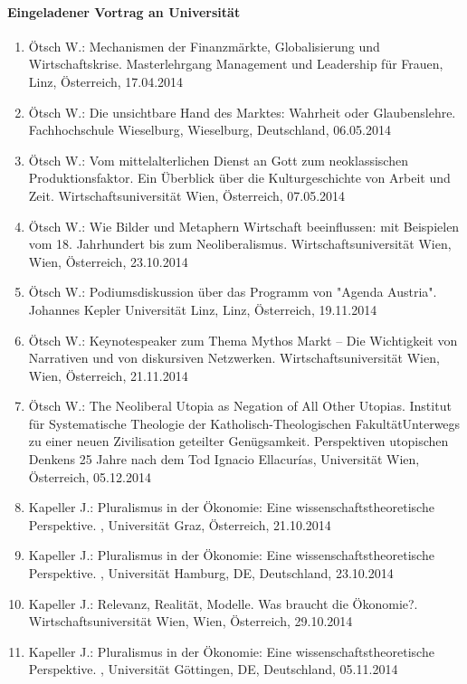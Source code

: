 \paragraph{Eingeladener Vortrag an Universität}
\begin{enumerate}
	\item Ötsch W.: Mechanismen der Finanzmärkte, Globalisierung und Wirtschaftskrise. Masterlehrgang Management und Leadership für Frauen, Linz, Österreich, 17.04.2014
	\item Ötsch W.: Die unsichtbare Hand des Marktes: Wahrheit oder Glaubenslehre. Fachhochschule Wieselburg, Wieselburg, Deutschland, 06.05.2014
	\item Ötsch W.: Vom mittelalterlichen Dienst an Gott zum neoklassischen Produktionsfaktor. Ein Überblick über die Kulturgeschichte von Arbeit und Zeit. Wirtschaftsuniversität Wien, Österreich, 07.05.2014
	\item Ötsch W.: Wie Bilder und Metaphern Wirtschaft beeinflussen: mit Beispielen vom 18. Jahrhundert bis zum Neoliberalismus. Wirtschaftsuniversität Wien, Wien, Österreich, 23.10.2014
	\item Ötsch W.: Podiumsdiskussion über das Programm von "Agenda Austria". Johannes Kepler Universität Linz, Linz, Österreich, 19.11.2014
	\item Ötsch W.: Keynotespeaker zum Thema Mythos Markt – Die Wichtigkeit von Narrativen und von diskursiven Netzwerken. Wirtschaftsuniversität Wien, Wien, Österreich, 21.11.2014
	\item Ötsch W.: The Neoliberal Utopia as Negation of All Other Utopias. Institut für Systematische Theologie der Katholisch-Theologischen FakultätUnterwegs zu einer neuen Zivilisation geteilter Genügsamkeit. Perspektiven utopischen Denkens 25 Jahre nach dem Tod Ignacio Ellacurías, Universität Wien, Österreich, 05.12.2014
	\item Kapeller J.: Pluralismus in der Ökonomie: Eine wissenschaftstheoretische Perspektive. , Universität Graz, Österreich, 21.10.2014
	\item Kapeller J.: Pluralismus in der Ökonomie: Eine wissenschaftstheoretische Perspektive. , Universität Hamburg, DE, Deutschland, 23.10.2014
	\item Kapeller J.: Relevanz, Realität, Modelle. Was braucht die Ökonomie?. Wirtschaftsuniversität Wien, Wien, Österreich, 29.10.2014
	\item Kapeller J.: Pluralismus in der Ökonomie: Eine wissenschaftstheoretische Perspektive. , Universität Göttingen, DE, Deutschland, 05.11.2014

\end{enumerate}

